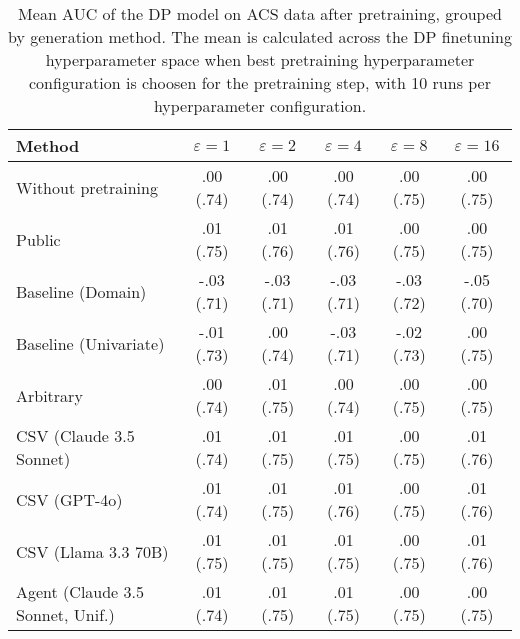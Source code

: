\begin{table}[h!]
    \centering
    \caption{Mean AUC of the DP model on ACS data after pretraining, grouped by generation method. The mean is calculated across the DP finetuning hyperparameter space when best pretraining hyperparameter configuration is choosen for the pretraining step, with 10 runs per hyperparameter configuration.}
    \label{tab:epsilon_comparison}
    \begin{tabular}{lccccc}
    \toprule
    Method & $\varepsilon=1$ & $\varepsilon=2$ & $\varepsilon=4$ & $\varepsilon=8$ & $\varepsilon=16$ \\
    \midrule
    Without pretraining & .00 {\small (.74)} & .00 {\small (.74)} & .00 {\small (.74)} & .00 {\small (.75)} & .00 {\small (.75)} \\
    \arrayrulecolor{black!50!}\midrule
    Public & \cellcolor{gold!30}.01 {\small (.75)} & \cellcolor{gold!30}.01 {\small (.76)} & \cellcolor{gold!30}.01 {\small (.76)} & \cellcolor{bronze!30}.00 {\small (.75)} & .00 {\small (.75)} \\
    \arrayrulecolor{black!50!}\midrule
    Baseline (Domain) & -.03 {\small (.71)} & -.03 {\small (.71)} & -.03 {\small (.71)} & -.03 {\small (.72)} & -.05 {\small (.70)} \\
    Baseline (Univariate) & -.01 {\small (.73)} & .00 {\small (.74)} & -.03 {\small (.71)} & -.02 {\small (.73)} & .00 {\small (.75)} \\
    \arrayrulecolor{black!50!}\midrule
    Arbitrary & .00 {\small (.74)} & .01 {\small (.75)} & .00 {\small (.74)} & .00 {\small (.75)} & .00 {\small (.75)} \\
    \arrayrulecolor{black!50!}\midrule
    CSV (Claude 3.5 Sonnet) & .01 {\small (.74)} & .01 {\small (.75)} & \cellcolor{silver!30}.01 {\small (.75)} & \cellcolor{silver!30}.00 {\small (.75)} & \cellcolor{silver!30}.01 {\small (.76)} \\
    CSV (GPT-4o) & .01 {\small (.74)} & \cellcolor{silver!30}.01 {\small (.75)} & \cellcolor{gold!30}.01 {\small (.76)} & \cellcolor{bronze!30}.00 {\small (.75)} & \cellcolor{gold!30}.01 {\small (.76)} \\
    CSV (Llama 3.3 70B) & \cellcolor{silver!30}.01 {\small (.75)} & \cellcolor{bronze!30}.01 {\small (.75)} & \cellcolor{silver!30}.01 {\small (.75)} & \cellcolor{silver!30}.00 {\small (.75)} & .01 {\small (.76)} \\
    \arrayrulecolor{black!50!}\midrule
    Agent (Claude 3.5 Sonnet, Unif.) & \cellcolor{bronze!30}.01 {\small (.74)} & .01 {\small (.75)} & \cellcolor{bronze!30}.01 {\small (.75)} & .00 {\small (.75)} & .00 {\small (.75)} \\

\end{tabular}
\end{table}
